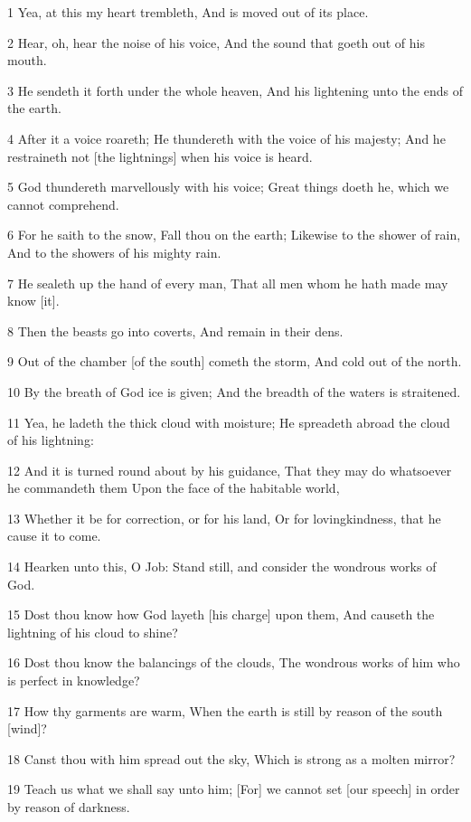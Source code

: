 \par 1 Yea, at this my heart trembleth, And is moved out of its place.
\par 2 Hear, oh, hear the noise of his voice, And the sound that goeth out of his mouth.
\par 3 He sendeth it forth under the whole heaven, And his lightening unto the ends of the earth.
\par 4 After it a voice roareth; He thundereth with the voice of his majesty; And he restraineth not [the lightnings] when his voice is heard.
\par 5 God thundereth marvellously with his voice; Great things doeth he, which we cannot comprehend.
\par 6 For he saith to the snow, Fall thou on the earth; Likewise to the shower of rain, And to the showers of his mighty rain.
\par 7 He sealeth up the hand of every man, That all men whom he hath made may know [it].
\par 8 Then the beasts go into coverts, And remain in their dens.
\par 9 Out of the chamber [of the south] cometh the storm, And cold out of the north.
\par 10 By the breath of God ice is given; And the breadth of the waters is straitened.
\par 11 Yea, he ladeth the thick cloud with moisture; He spreadeth abroad the cloud of his lightning:
\par 12 And it is turned round about by his guidance, That they may do whatsoever he commandeth them Upon the face of the habitable world,
\par 13 Whether it be for correction, or for his land, Or for lovingkindness, that he cause it to come.
\par 14 Hearken unto this, O Job: Stand still, and consider the wondrous works of God.
\par 15 Dost thou know how God layeth [his charge] upon them, And causeth the lightning of his cloud to shine?
\par 16 Dost thou know the balancings of the clouds, The wondrous works of him who is perfect in knowledge?
\par 17 How thy garments are warm, When the earth is still by reason of the south [wind]?
\par 18 Canst thou with him spread out the sky, Which is strong as a molten mirror?
\par 19 Teach us what we shall say unto him; [For] we cannot set [our speech] in order by reason of darkness.
